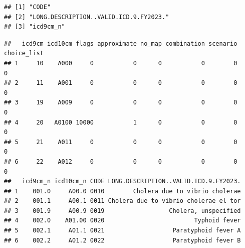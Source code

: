 \documentclass[
]{article}
\begin{document}
\begin{verbatim}
## [1] "CODE"                                 
## [2] "LONG.DESCRIPTION..VALID.ICD.9.FY2023."
## [3] "icd9cm_n"
\end{verbatim}

\begin{verbatim}
##   icd9cm icd10cm flags approximate no_map combination scenario choice_list
## 1     10    A000     0           0      0           0        0           0
## 2     11    A001     0           0      0           0        0           0
## 3     19    A009     0           0      0           0        0           0
## 4     20   A0100 10000           1      0           0        0           0
## 5     21    A011     0           0      0           0        0           0
## 6     22    A012     0           0      0           0        0           0
##   icd9cm_n icd10cm_n CODE LONG.DESCRIPTION..VALID.ICD.9.FY2023.
## 1    001.0     A00.0 0010        Cholera due to vibrio cholerae
## 2    001.1     A00.1 0011 Cholera due to vibrio cholerae el tor
## 3    001.9     A00.9 0019                  Cholera, unspecified
## 4    002.0    A01.00 0020                         Typhoid fever
## 5    002.1     A01.1 0021                   Paratyphoid fever A
## 6    002.2     A01.2 0022                   Paratyphoid fever B
\end{verbatim}
\end{document}
